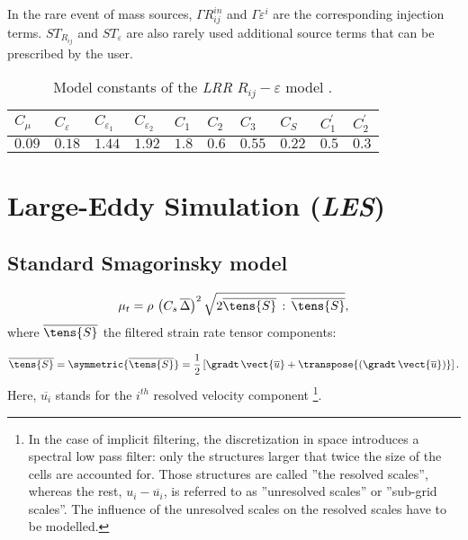 In the rare event of mass sources, $\Gamma R_{ij}^{in}$ and $\Gamma
\varepsilon ^{i}$ are the corresponding injection terms. $ST_{R_{ij}}$ and $%
ST_{\varepsilon }$ are also rarely used additional source terms that can be
prescribed by the user.

\begin{table}[!htp]
\begin{center}
\begin{tabular}{p{}|p{}|p{}|p{}|p{}|p{}|p{}|p{}|p{}|p{}}
$C_\mu$ & $C_{\varepsilon}$ & $C_{\varepsilon_1}$ & $C_{\varepsilon_2}$ & $%
C_1$ & $C_2$ & $C_3$ & $C_S$ & $C^{\prime}_1$ & $C^{\prime}_2$ \\ \hline
$0.09$ & $0.18$ & $1.44$ & $1.92$ & $1.8$ & $0.6$ & $0.55$ & $0.22$ & $0.5$
& $0.3$
\end{tabular}
\end{center}
\caption{Model constants of the \emph{LRR} $R_{ij}-\varepsilon$ model \cite{Launder:1975}.}
\end{table}

\section{Large-Eddy Simulation (\emph{LES})}

\subsection{Standard Smagorinsky model}

\begin{equation}
\mu_{t}=\rho \, \left( C_{s}\,\overline{\Delta } \right)^{2}
\sqrt{2\overline{\tens{S}} \,: \, \overline{\tens{S}}},
\end{equation}%
%
where $\overline{\tens{S}}$ the filtered strain rate tensor components:

\begin{equation}
\overline{\tens{S}}= \symmetric{\overline{\tens{S}}} =
\frac{1}{2} \left[ \gradt \, \vect{\overline{u}} + \transpose{\left( \gradt \, \vect{\overline{u}} \right)}
\right].
\end{equation}
%
%
Here, $\overline{u_{i}}$ stands for the $i^{th}$ resolved velocity component
\footnote{%
In the case of implicit filtering, the discretization in space introduces a
spectral low pass filter: only the structures larger that twice the size of
the cells are accounted for. Those structures are called ''the resolved
scales'', whereas the rest, $u_{i}-\overline{u_{i}}$, is referred to as
''unresolved scales'' or ''sub-grid scales''. The influence of the
unresolved scales on the resolved scales have to be modelled.}.

